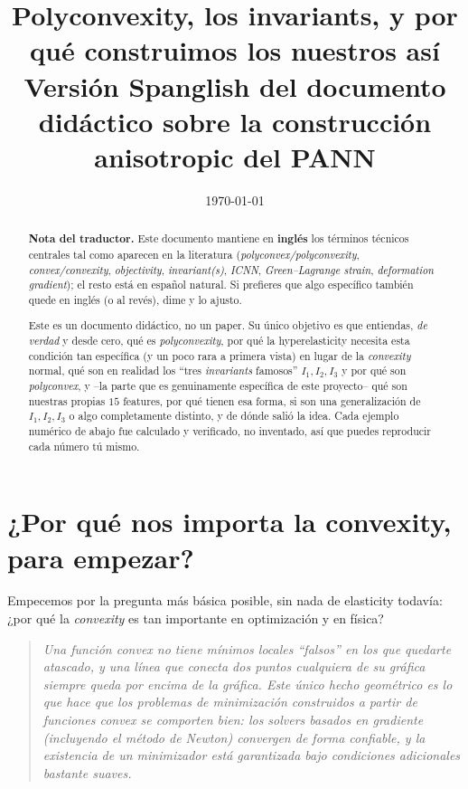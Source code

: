 \documentclass[11pt,a4paper]{article}
\title{Polyconvexity, los invariants, y por qu\'e construimos los nuestros as\'i\\
\large Versi\'on Spanglish del documento did\'actico sobre la construcci\'on anisotropic del PANN}
\author{}
\date{\today}
\newenvironment{takeaway}
 {\begin{quote}\small\itshape\color{blue!60!black}}
 {\end{quote}}
\begin{document}
\maketitle

\begin{abstract}
\textbf{Nota del traductor.} Este documento mantiene en \textbf{ingl\'es}
los t\'erminos t\'ecnicos centrales tal como aparecen en la literatura
(\emph{polyconvex/polyconvexity}, \emph{convex/convexity},
\emph{objectivity}, \emph{invariant(s)}, \emph{ICNN}, \emph{Green--Lagrange
strain}, \emph{deformation gradient}); el resto est\'a en espa\~nol
natural. Si prefieres que algo espec\'ifico tambi\'en quede en ingl\'es
(o al rev\'es), dime y lo ajusto.

Este es un documento did\'actico, no un paper. Su \'unico objetivo es que
entiendas, \emph{de verdad} y desde cero, qu\'e es \emph{polyconvexity},
por qu\'e la hyperelasticity necesita esta condici\'on tan espec\'ifica
(y un poco rara a primera vista) en lugar de la \emph{convexity} normal,
qu\'e son en realidad los ``tres \emph{invariants} famosos'' $I_1,I_2,I_3$
y por qu\'e son \emph{polyconvex}, y --la parte que es genuinamente
espec\'ifica de este proyecto-- qu\'e son nuestras propias $15$
features, por qu\'e tienen esa forma, si son una generalizaci\'on de
$I_1,I_2,I_3$ o algo completamente distinto, y de d\'onde sali\'o la
idea. Cada ejemplo num\'erico de abajo fue calculado y verificado, no
inventado, as\'i que puedes reproducir cada n\'umero t\'u mismo.
\end{abstract}

\tableofcontents

\section{¿Por qu\'e nos importa la convexity, para empezar?}
\label{sec:motivation}

Empecemos por la pregunta m\'as b\'asica posible, sin nada de
elasticity todav\'ia: ¿por qu\'e la \emph{convexity} es tan importante
en optimizaci\'on y en f\'isica?

\begin{takeaway}
Una funci\'on \emph{convex} no tiene m\'inimos locales ``falsos'' en los
que quedarte atascado, y una l\'inea que conecta dos puntos cualquiera
de su gr\'afica siempre queda por encima de la gr\'afica. Este \'unico
hecho geom\'etrico es lo que hace que los problemas de minimizaci\'on
construidos a partir de funciones \emph{convex} se comporten bien:
los solvers basados en gradiente (incluyendo el m\'etodo de Newton)
convergen de forma confiable, y la existencia de un minimizador est\'a
garantizada bajo condiciones adicionales bastante suaves.
\end{takeaway}
\end{document}

